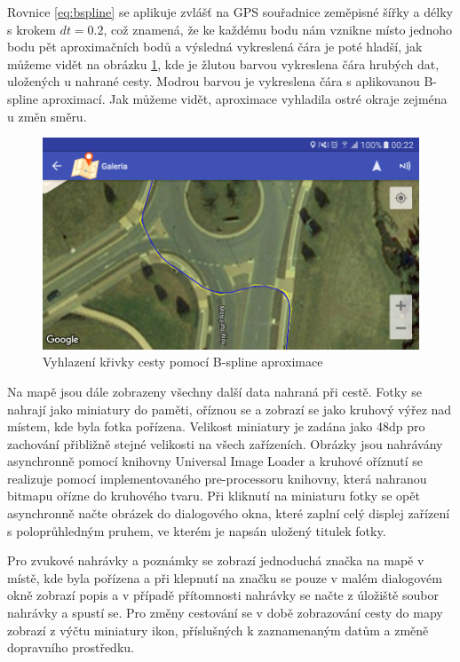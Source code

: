 \documentclass[czech,master,public,dept460,male,java,cpdeclaration]{diploma}
\begin{document}
Rovnice \ref{eq:bspline} se aplikuje zvlášť na GPS souřadnice zeměpisné šířky a délky s krokem $dt = 0.2$,
 což znamená, že ke každému bodu nám vznikne místo jednoho bodu pět aproximačních bodů a výsledná
 vykreslená čára je poté hladší, jak můžeme vidět na obrázku \ref{fig:splinediff}, kde je žlutou barvou
 vykreslena čára hrubých dat, uložených u nahrané cesty. Modrou barvou je vykreslena čára s aplikovanou
 B-spline aproximací. Jak můžeme vidět, aproximace vyhladila ostré okraje zejména u změn směru.

\begin{figure}[H]
        \centering
                \includegraphics[scale=0.3]{img/screen/bsplineapplied.png}
        \caption{Vyhlazení křivky cesty pomocí B-spline aproximace}
        \label{fig:splinediff}
\end{figure}

Na mapě jsou dále zobrazeny všechny další data nahraná při cestě. Fotky se nahrají jako miniatury do paměti,
oříznou se a zobrazí se jako kruhový výřez nad místem, kde byla fotka pořízena.
Velikost miniatury je zadána jako 48dp pro zachování přibližně stejné velikosti na všech zařízeních.
Obrázky jsou nahrávány asynchronně pomocí knihovny Universal Image Loader a kruhové oříznutí se realizuje
pomocí implementovaného pre-processoru knihovny, která nahranou bitmapu ořízne do kruhového tvaru.
Při kliknutí na miniaturu fotky se opět asynchronně načte obrázek do dialogového okna,
které zaplní celý displej zařízení s poloprůhledným pruhem, ve kterém je napsán uložený titulek fotky.

Pro zvukové nahrávky a poznámky se zobrazí jednoduchá značka na mapě v místě, kde byla pořízena a při
klepnutí na značku se pouze v malém dialogovém okně zobrazí popis a v případě přítomnosti nahrávky
se načte z úložiště soubor nahrávky a spustí se. Pro změny cestování se v době zobrazování cesty do mapy
zobrazí z výčtu miniatury ikon, příslušných k zaznamenaným datům a změně dopravního prostředku.
\end{document}
